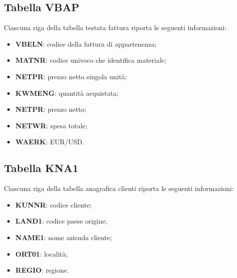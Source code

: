 \subsection{Tabella VBAP}
Ciascuna riga della tabella testata fattura riporta le seguenti informazioni:
\begin{itemize}
	\item \textbf{VBELN}: codice della fattura di appartenenza;
	\item \textbf{MATNR}: codice univoco che identifica materiale;
	\item \textbf{NETPR}: prezzo netto singola unità;
	\item \textbf{KWMENG}: quantità acquistata;
	\item \textbf{NETPR}: prezzo netto;
	\item \textbf{NETWR}: spesa totale;
	\item \textbf{WAERK}: EUR/USD.
\end{itemize}

\subsection{Tabella KNA1}
Ciascuna riga della tabella anagrafica clienti riporta le seguenti informazioni:
\begin{itemize}
	\item \textbf{KUNNR}: codice cliente;
	\item \textbf{LAND1}: codice paese origine;
	\item \textbf{NAME1}: nome azienda cliente;
	\item \textbf{ORT01}: località; 
	\item \textbf{REGIO}: regione.
\end{itemize}

